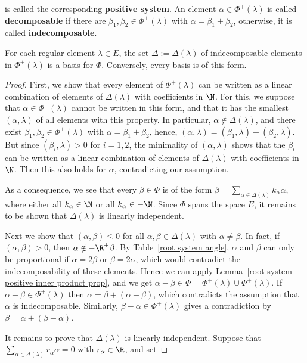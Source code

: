 is called the corresponding \textbf{positive system}. An element $\alpha\in\Phi^+(\lambda)$ is called \textbf{decomposable} if there are $\beta_1,\beta_2\in\Phi^+(\lambda)$ with $\alpha=\beta_1+\beta_2$, otherwise, it is called \textbf{indecomposable}.
\begin{theorem}\label{root system basis and Weyl chamber}
For each regular element $\lambda\in E$, the set $\Delta:=\Delta(\lambda)$ of indecomposable elements in $\Phi^+(\lambda)$ is a basis for $\Phi$. Conversely, every basis is of this form.
\end{theorem}
\begin{proof}
First, we show that every element of $\Phi^+(\lambda)$ can be written as a linear combination of elements of $\Delta(\lambda)$ with coefficients in $\N$. For this, we suppose that $\alpha\in\Phi^+(\lambda)$ cannot be written in this form, and that it has the smallest $(\alpha,\lambda)$ of all elements with this property. In particular, $\alpha\notin\Delta(\lambda)$, and there exist $\beta_1,\beta_2\in\Phi^+(\lambda)$ with $\alpha=\beta_1+\beta_2$, hence, $(\alpha,\lambda)=(\beta_1,\lambda)+(\beta_2,\lambda)$. But since $(\beta_i,\lambda)>0$ for $i=1,2$, the minimality of $(\alpha,\lambda)$ shows that the $\beta_i$ can be written as a linear combination of elements of $\Delta(\lambda)$ with coefficients in $\N$. Then this also holds for $\alpha$, contradicting our assumption.\par
As a consequence, we see that every $\beta\in\Phi$ is of the form $\beta=\sum_{\alpha\in\Delta(\lambda)}k_\alpha\alpha$, where either all $k_\alpha\in\N$ or all $k_\alpha\in-\N$. Since $\Phi$ spans the space $E$, it remains to be shown that $\Delta(\lambda)$ is linearly independent.\par
Next we show that $(\alpha,\beta)\leq 0$ for all $\alpha,\beta\in\Delta(\lambda)$ with $\alpha\neq\beta$. In fact, if $(\alpha,\beta)>0$, then $\alpha\notin-\R^+\beta$. By Table~\ref{root system angle}, $\alpha$ and $\beta$ can only be proportional if $\alpha=2\beta$ or $\beta=2\alpha$, which would contradict the indecomposability of these elements. Hence we can apply Lemma~\ref{root system positive inner product prop}, and we get $\alpha-\beta\in\Phi=\Phi^+(\lambda)\cup\Phi^+(\lambda)$. If $\alpha-\beta\in\Phi^+(\lambda)$ then $\alpha=\beta+(\alpha-\beta)$, which contradicts the assumption that $\alpha$ is indecomposable. Similarly, $\beta-\alpha\in\Phi^+(\lambda)$ gives a contradiction by $\beta=\alpha+(\beta-\alpha)$.\par
It remains to prove that $\Delta(\lambda)$ is linearly independent. Suppose that $\sum_{\alpha\in\Delta(\lambda)}r_\alpha\alpha=0$ with $r_\alpha\in\R$, and set

\end{proof}
